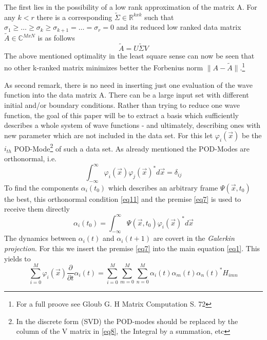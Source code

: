 \documentclass[usenatbib]{mn2e}
\begin{document}
The first lies in the possibility of a low rank approximation of the matrix A. For any \(k<r\) there is a corresponding \(\widetilde{\Sigma} \in \mathbb{R}^{kxk} \) such that \(\sigma_1 \geq \dots \geq \sigma_k \geq \sigma_{k+1} = \dots = \sigma_r =0\) and its reduced low ranked data matrix \(\widetilde{A} \in \mathbb{C}^{MxN} \) is as follows
\begin{equation}\label{eq10}
\widetilde{A}=U \widetilde{\Sigma} V
\end{equation} 
The above mentioned optimality in the least square sense can now be seen that no other k-ranked matrix minimizes better the Forbenius norm \(\| A-\widetilde{A} \|\).\footnote{For a full proove see Gloub G. H  Matrix Computation S. 72}

 As second remark, there is no need in inserting just one evaluation of the wave function into the data matrix A. There can be a large input set with different initial and/or boundary conditions. Rather than trying to reduce one wave function, the goal of this paper will be to extract a basis which sufficiently  describes a whole system of wave functions - and ultimately, describing ones with new parameter which are not included in the data set. For this let \(\varphi_i(\overrightarrow{x})\) be the \(i_{th}\) POD-Mode\footnote{In the discrete form (SVD) the POD-modes should be replaced by the column of the V matrix in \ref{eq8}, the Integral by a summation, etc}
 of such a data set. As already mentioned the POD-Modes are orthonormal, i.e.
 \begin{equation}\label{eq11}
\int_{-\infty}^\infty \varphi_i(\overrightarrow{x})  \varphi_j(\overrightarrow{x})^* d\overrightarrow{x} = \delta_{ij} 
\end{equation} 
To find the components \(\alpha_i(t_0)\) which describes an arbitrary frame \(\Psi(\overrightarrow{x},t_0)\) the best, this orthonormal condition \ref{eq11} and the premise \ref{eq7} is used to receive them directly
 \begin{equation}\label{eq12}
\alpha_i(t_0) =\int_{-\infty}^\infty \Psi(\overrightarrow{x},t_0) \varphi_i(\overrightarrow{x})^* d\overrightarrow{x}
\end{equation} 
The dynamics between \(\alpha_i(t)\) and \(\alpha_i(t+1)\) are covert in the \textit{Galerkin projection}. For this we insert the premise \ref{eq7} into the main equation \ref{eq1}. This yields to
 \begin{equation}\label{eq13}
\sum_{i=0}^M \varphi_i(\overrightarrow{x}) \dfrac {\partial } {\partial t} \alpha_i(t) = \sum_{i=0}^M \sum_{m=0}^M \sum_{n=0}^M \alpha_i(t) \alpha_m(t) \alpha_n(t)^* H_{imn}
\end{equation} 
\end{document}
